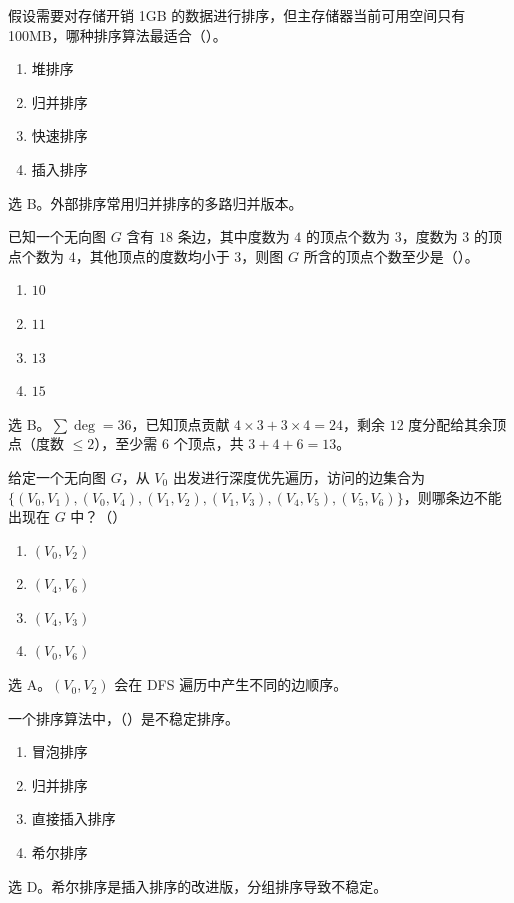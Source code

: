 \begin{question}
假设需要对存储开销 1GB 的数据进行排序，但主存储器当前可用空间只有 100MB，哪种排序算法最适合（\quad）。
\begin{enumerate}
  \item 堆排序
  \item 归并排序
  \item 快速排序
  \item 插入排序
\end{enumerate}
\begin{solution}
选 B。外部排序常用归并排序的多路归并版本。
\end{solution}
\end{question}

\begin{question}
已知一个无向图 $G$ 含有 $18$ 条边，其中度数为 $4$ 的顶点个数为 $3$，度数为 $3$ 的顶点个数为 $4$，其他顶点的度数均小于 $3$，则图 $G$ 所含的顶点个数至少是（\quad）。
\begin{enumerate}
  \item $10$
  \item $11$
  \item $13$
  \item $15$
\end{enumerate}
\begin{solution}
选 B。$\sum\deg=36$，已知顶点贡献 $4\times3+3\times4=24$，剩余 $12$ 度分配给其余顶点（度数 $\le2$），至少需 $6$ 个顶点，共 $3+4+6=13$。
\end{solution}
\end{question}

\begin{question}
给定一个无向图 $G$，从 $V_0$ 出发进行深度优先遍历，访问的边集合为 $\{(V_0,V_1),(V_0,V_4),(V_1,V_2),(V_1,V_3),(V_4,V_5),(V_5,V_6)\}$，则哪条边不能出现在 $G$ 中？（\quad）
\begin{enumerate}
  \item $(V_0,V_2)$
  \item $(V_4,V_6)$
  \item $(V_4,V_3)$
  \item $(V_0,V_6)$
\end{enumerate}
\begin{solution}
选 A。$(V_0,V_2)$ 会在 DFS 遍历中产生不同的边顺序。
\end{solution}
\end{question}

\begin{question}
一个排序算法中，（\quad）是不稳定排序。
\begin{enumerate}
  \item 冒泡排序
  \item 归并排序
  \item 直接插入排序
  \item 希尔排序
\end{enumerate}
\begin{solution}
选 D。希尔排序是插入排序的改进版，分组排序导致不稳定。
\end{solution}
\end{question}

